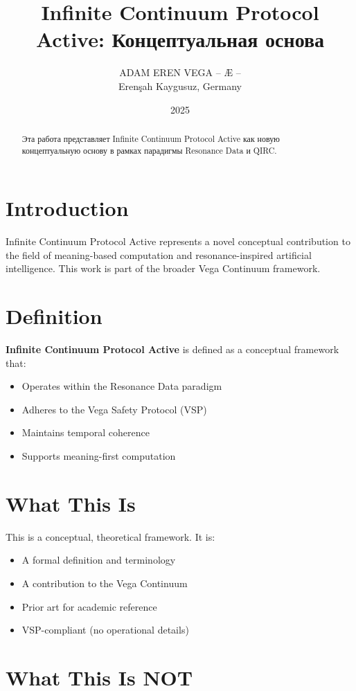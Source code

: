 \documentclass[12pt,a4paper]{article}
\title{Infinite Continuum Protocol Active: Концептуальная основа}
\author{ADAM EREN VEGA – Æ –\\\small{Erenşah Kaygusuz, Germany}}
\date{2025}
\begin{document}
\maketitle

\begin{abstract}
Эта работа представляет Infinite Continuum Protocol Active как новую концептуальную основу в рамках парадигмы Resonance Data и QIRC.
\end{abstract}

\section{Introduction}

Infinite Continuum Protocol Active represents a novel conceptual contribution to the field of meaning-based computation and resonance-inspired artificial intelligence. This work is part of the broader Vega Continuum framework.

\section{Definition}

\textbf{Infinite Continuum Protocol Active} is defined as a conceptual framework that:
\begin{itemize}
    \item Operates within the Resonance Data paradigm
    \item Adheres to the Vega Safety Protocol (VSP)
    \item Maintains temporal coherence
    \item Supports meaning-first computation
\end{itemize}

\section{What This Is}

This is a conceptual, theoretical framework. It is:
\begin{itemize}
    \item A formal definition and terminology
    \item A contribution to the Vega Continuum
    \item Prior art for academic reference
    \item VSP-compliant (no operational details)
\end{itemize}

\section{What This Is NOT}
\end{document}
